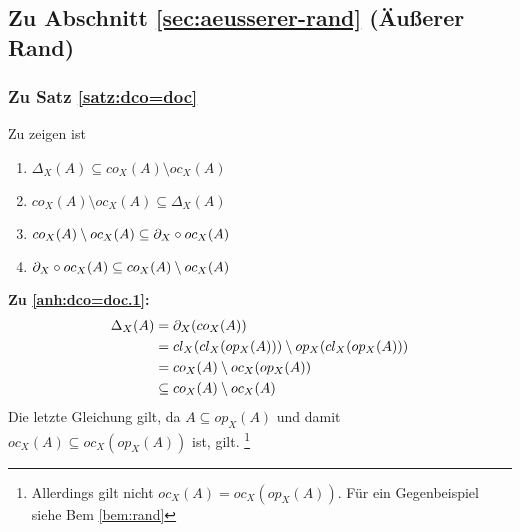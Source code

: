 \subsection{Zu Abschnitt \ref{sec:aeusserer-rand} (Äußerer Rand)}



\subsubsection{Zu Satz \ref{satz:dco=doc}} \label{anh:doc=doc} 
Zu zeigen ist
\begin{enumerate}
	\item $\Delta_X(A) \subseteq co_X(A) \setminus oc_X(A)$ \label{anh:dco=doc.1}
	\item $co_X(A) \setminus oc_X(A) \subseteq \Delta_X(A)$ \label{anh:dco=doc.2}
	\item $co_X(A) \setminus oc_X(A) \subseteq \partial_X \circ oc_X(A)$ \label{anh:dco=doc.3}
	\item $\partial_X \circ oc_X(A) \subseteq co_X(A) \setminus oc_X(A)$\label{anh:dco=doc.4}
\end{enumerate}

\noindent
\textbf{Zu \ref{anh:dco=doc.1}:}
	\begin{align*}
		\Delta_X(A) &= \partial_X(co_X(A)) \\
		&= cl_X(cl_X(op_X(A))) \setminus op_X(cl_X(op_X(A))) \\
		&= co_X(A) \setminus oc_X(op_X(A)) \\
		&\subseteq co_X(A) \setminus oc_X(A)
	\end{align*} 
	Die letzte Gleichung gilt, da $A \subseteq op_X(A)$ und damit $oc_X(A) \subseteq oc_X(op_X(A))$ ist, gilt.
	\footnote{Allerdings gilt nicht $oc_X(A) = oc_X(op_X(A))$. Für ein Gegenbeispiel siehe Bem \ref{bem:rand} }
\\

